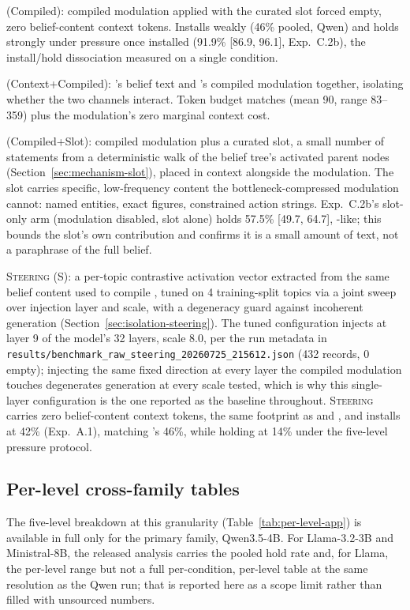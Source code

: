 \condC{} (Compiled): compiled modulation applied with the curated slot forced empty,
zero belief-content context tokens. Installs weakly (46\% pooled, Qwen) and holds
strongly under pressure once installed (91.9\% [86.9, 96.1], Exp.~C.2b), the
install/hold dissociation measured on a single condition.

\condD{} (Context+Compiled): \condB{}'s belief text and \condC{}'s compiled modulation
together, isolating whether the two channels interact. Token budget matches \condB{}
(mean 90, range 83--359) plus the modulation's zero marginal context cost.

\condF{} (Compiled+Slot): compiled modulation plus a curated slot, a small number of
statements from a deterministic walk of the belief tree's activated parent nodes
(Section~\ref{sec:mechanism-slot}), placed in context alongside the modulation. The slot
carries specific, low-frequency content the bottleneck-compressed modulation cannot:
named entities, exact figures, constrained action strings. Exp.~C.2b's slot-only arm
(modulation disabled, slot alone) holds 57.5\% [49.7, 64.7], \condB{}-like; this bounds
the slot's own contribution and confirms it is a small amount of text, not a
paraphrase of the full belief.

\textsc{Steering} (S): a per-topic contrastive activation vector extracted from the same
belief content used to compile \condF{}, tuned on 4 training-split topics via a joint
sweep over injection layer and scale, with a degeneracy guard against incoherent
generation (Section~\ref{sec:isolation-steering}). The tuned configuration injects at
layer 9 of the model's 32 layers, scale 8.0, per the run metadata in
\texttt{results/benchmark\_raw\_steering\_20260725\_215612.json} (432 records, 0 empty);
injecting the same fixed direction at every layer the compiled modulation touches
degenerates generation at every scale tested, which is why this single-layer
configuration is the one reported as the baseline throughout. \textsc{Steering} carries
zero belief-content context tokens, the same footprint as \condC{} and \condF{}, and
installs at 42\% (Exp.~A.1), matching \condC{}'s 46\%, while holding at 14\% under the
five-level pressure protocol.

\subsection{Per-level cross-family tables}
\label{app:crossfamily}

The five-level breakdown at this granularity (Table~\ref{tab:per-level-app}) is available in
full only for the primary family, Qwen3.5-4B. For Llama-3.2-3B and Ministral-8B, the released
analysis carries the pooled hold rate and, for Llama, the per-level range but not a full
per-condition, per-level table at the same resolution as the Qwen run; that is reported here
as a scope limit rather than filled with unsourced numbers.

